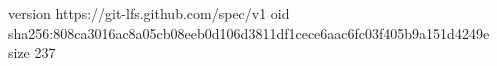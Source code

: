 version https://git-lfs.github.com/spec/v1
oid sha256:808ca3016ac8a05cb08eeb0d106d3811df1cece6aac6fc03f405b9a151d4249e
size 237

